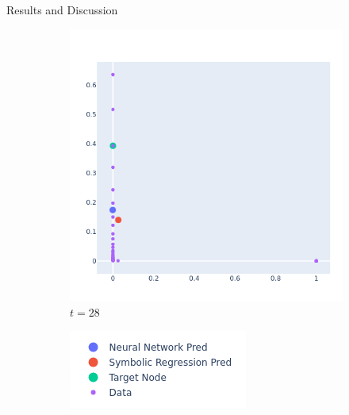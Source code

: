 \documentclass[12pt]{amsbook}
\begin{document}
\begin{chapter}{Results and Discussion}
\begin{figure}
\begin{subfigure}[p]{0.35\textwidth}
                    \includegraphics[width=\linewidth]{./Plots/Test Only/longTail/longTail 3 small net.png}
                    \vspace{-1.5cm}
                    \caption{$t=28$}
                    \label{longtail series 3}
                \end{subfigure}
                \begin{subfigure}[p]{0.35\textwidth}
                    \hspace{0.3cm}
                    \vspace{3.5cm}
                    \includegraphics[width=0.7\linewidth]{./Plots/key.png}

                \end{subfigure}


\end{figure}
\end{chapter}
\end{document}
